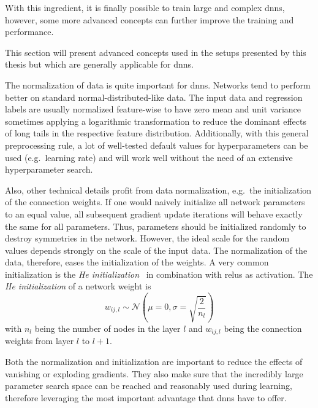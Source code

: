 With this ingredient, it is finally possible to train large and complex \glspl{dnn}, however, some more advanced concepts can further improve the training and performance.


This section will present advanced concepts used in the setups presented by this thesis but which are generally applicable for \glspl{dnn}.

\label{sssec:normalization}

The normalization of data is quite important for \glspl{dnn}. Networks tend to perform better on standard normal-distributed-like data. The input data and regression labels are usually normalized feature-wise to have zero mean and unit variance sometimes applying a logarithmic transformation to reduce the dominant effects of long tails in the respective feature distribution. Additionally, with this general preprocessing rule, a lot of well-tested default values for hyperparameters can be used (e.g.\ learning rate) and will work well without the need of an extensive hyperparameter search.

Also, other technical details profit from data normalization, e.g.\ the initialization of the connection weights. If one would naively initialize all network parameters to an equal value, all subsequent gradient update iterations will behave exactly the same for all parameters. Thus, parameters should be initialized randomly to destroy symmetries in the network. However, the ideal scale for the random values depends strongly on the scale of the input data. The normalization of the data, therefore, eases the initialization of the weights. A very common initialization is the \emph{He initialization}~\cite{heinit} in combination with \glspl{relu} as activation. The \emph{He initialization} of a network weight is
\begin{equation}
    w_{ij, l} \sim \mathcal{N}\left(\mu = 0 , \sigma = \sqrt{\frac2{n_l}}\right)
\end{equation} with \(n_l\) being the number of nodes in the layer \(l\) and \(w_{ij, l}\) being the connection weights from layer \(l\) to \(l+1\).

Both the normalization and initialization are important to reduce the effects of vanishing or exploding gradients. They also make sure that the incredibly large parameter search space can be reached and reasonably used during learning, therefore leveraging the most important advantage that \glspl{dnn} have to offer.

